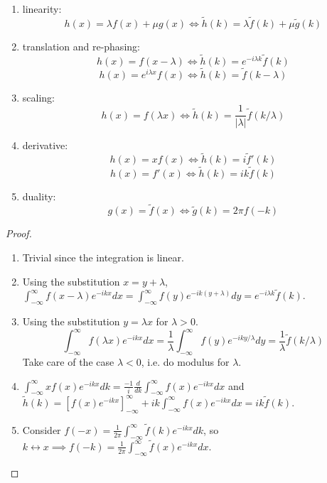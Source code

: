 \documentclass[a4paper]{article}
\begin{document}
\begin{thm}\leavevmode
\begin{enumerate}
    \item linearity: 
    \begin{equation}
    h(x)=\lambda f(x)+\mu g(x)\iff\tilde{h}(k)=\lambda\tilde{f}(k)+\mu\tilde{g}(k)\tag{4.8}
    \end{equation}
    \item translation and re-phasing:
    \begin{equation}
        h(x)=f(x-\lambda)\iff\tilde{h}(k)=e^{-i\lambda k}\tilde{f}(k)\tag{4.9}
    \end{equation}
    \begin{equation}
        h(x)=e^{i\lambda x}f(x)\iff\tilde{h}(k)=\tilde{f}(k-\lambda)\tag{4.10}
    \end{equation}
    \item scaling:
    \begin{equation}
        h(x)=f(\lambda x)\iff\tilde{h}(k)=\frac{1}{|\lambda|}\tilde{f}(k/\lambda)\tag{4.11}
    \end{equation}
    \item derivative:
    \begin{equation}
        h(x)=xf(x)\iff\tilde{h}(k)=i\tilde{f}'(k)\tag{4.12}
    \end{equation}
    \begin{equation}
        h(x)=f'(x)\iff\tilde{h}(k)=ik\tilde{f}(k)\tag{4.13}
    \end{equation}
    \item duality:
    \begin{equation}
        g(x)=\tilde{f}(x)\iff\tilde{g}(k)=2\pi f(-k)\tag{4.14}
    \end{equation}
\end{enumerate}
\end{thm}
\begin{proof}\leavevmode
\begin{enumerate}
    \item Trivial since the integration is linear.
    \item Using the substitution $x=y+\lambda$,
    $\int_{-\infty}^\infty f(x-\lambda)e^{-ikx}dx=\int_{-\infty}^\infty f(y)e^{-ik(y+\lambda)}dy=e^{-i\lambda k}\tilde{f}(k)$.
    \item Using the substitution $y=\lambda x$ for $\lambda>0$.
    $$\int_{-\infty}^\infty f(\lambda x)e^{-ikx}dx=\frac{1}{\lambda}\int_{-\infty}^\infty f(y)e^{-iky/\lambda}dy=\frac{1}{\lambda}\tilde{f}(k/\lambda)$$
    Take care of the case $\lambda<0$, i.e. do modulus for $\lambda$.
    \item $\int_{-\infty}^\infty xf(x)e^{-ikx}dk=\frac{-1}{i}\frac{d}{dk}\int_{-\infty}^\infty f(x)e^{-ikx}dx$ and $\tilde{h}(k)=[f(x)e^{-ikx}]_{-\infty}^\infty+ik\int_{-\infty}^\infty f(x)e^{-ikx}dx=ik\tilde{f}(k)$.
    \item  Consider $f(-x)=\frac{1}{2\pi}\int_{-\infty}^\infty\tilde{f}(k)e^{-ikx}dk$, so $k\leftrightarrow x\implies f(-k)=\frac{1}{2\pi}\int_{-\infty}^\infty\tilde{f}(x)e^{-ikx}dx$.
\end{enumerate}
\end{proof}
\end{document}
